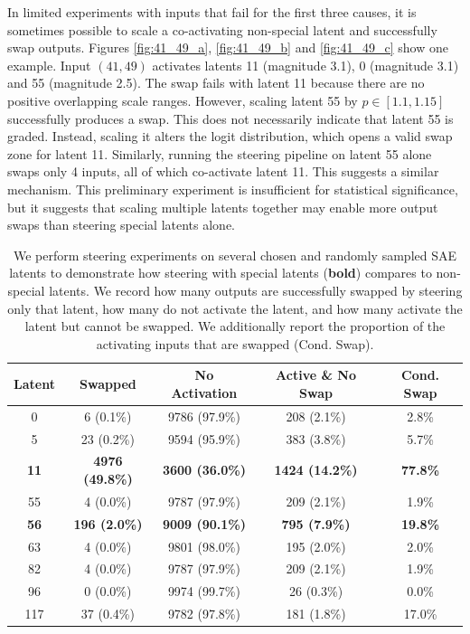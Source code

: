 In limited experiments with inputs that fail for the first three causes, it is sometimes possible to scale a co-activating non-special latent and successfully swap outputs. 
Figures \ref{fig:41_49_a}, \ref{fig:41_49_b} and \ref{fig:41_49_c} show one example. Input $(41,49)$ activates latents 11 (magnitude 3.1), 0 (magnitude 3.1) and 55 (magnitude 2.5). The swap fails with latent 11 because there are no positive overlapping scale ranges. However, scaling latent 55 by $p \in [1.1, 1.15]$ successfully produces a swap. This does not necessarily indicate that latent 55 is graded. Instead, scaling it alters the logit distribution, which opens a valid swap zone for latent 11. Similarly, running the steering pipeline on latent 55 alone swaps only 4 inputs, all of which co-activate latent 11. This suggests a similar mechanism. This preliminary experiment is insufficient for statistical significance, but it suggests that scaling multiple latents together may enable more output swaps than steering special latents alone.

\begin{table}[ht]
\centering
\caption{We perform steering experiments on several chosen and randomly sampled SAE latents to demonstrate how steering with special latents (\textbf{bold}) compares to non-special latents. We record how many outputs are successfully swapped by steering only that latent, how many do not activate the latent, and how many activate the latent but cannot be swapped. We additionally report the proportion of the activating inputs that are swapped (Cond. Swap).}
\label{tab:latent_swap_metrics}
\vspace{0.5em}
\begin{tabular}{@{}ccccc@{}}
\toprule
\textbf{Latent} & \textbf{Swapped} & \textbf{No Activation} & \textbf{Active \& No Swap} & \textbf{Cond. Swap} \\
\midrule
0   & 6 (0.1\%)  & 9786 (97.9\%) & 208 (2.1\%)  & 2.8\% \\
5   & 23 (0.2\%)  & 9594 (95.9\%) & 383 (3.8\%)  & 5.7\% \\
\textbf{11}  & \textbf{4976 (49.8\%)} & \textbf{3600 (36.0\%)} & \textbf{1424 (14.2\%)} & \textbf{77.8\%} \\
55  & 4 (0.0\%)  & 9787 (97.9\%) & 209 (2.1\%)  & 1.9\% \\
\textbf{56}  & \textbf{196 (2.0\%)}  & \textbf{9009 (90.1\%)} & \textbf{795 (7.9\%)}  & \textbf{19.8\%} \\
63  & 4 (0.0\%)  & 9801 (98.0\%) & 195 (2.0\%)  & 2.0\% \\
82  & 4 (0.0\%)  & 9787 (97.9\%) & 209 (2.1\%)  & 1.9\% \\
96  & 0 (0.0\%)  & 9974 (99.7\%) & 26 (0.3\%)  & 0.0\% \\
117 & 37 (0.4\%)  & 9782 (97.8\%) & 181 (1.8\%)  & 17.0\% \\
\bottomrule
\end{tabular}
\end{table}

